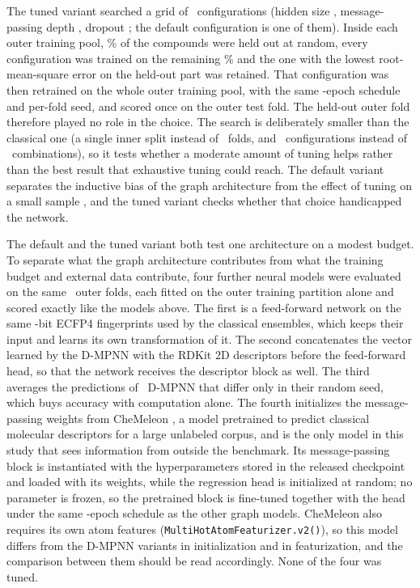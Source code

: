 The tuned variant searched a grid of \GnnTunedNConfigs\ configurations (hidden size \GnnGridHiddenSizes, message-passing depth \GnnGridDepths, dropout \GnnGridDropouts; the default configuration is one of them). Inside each outer training pool, \GnnInnerValPct\% of the compounds were held out at random, every configuration was trained on the remaining \GnnInnerTrainPct\% and the one with the lowest root-mean-square error on the held-out part was retained. That configuration was then retrained on the whole outer training pool, with the same \GnnEpochs-epoch schedule and per-fold seed, and scored once on the outer test fold. The held-out outer fold therefore played no role in the choice. The search is deliberately smaller than the classical one (a single inner split instead of \InnerKFolds\ folds, and \GnnTunedNConfigs\ configurations instead of \NArchitectureCombos\ combinations), so it tests whether a moderate amount of tuning helps rather than the best result that exhaustive tuning could reach. The default variant separates the inductive bias of the graph architecture from the effect of tuning on a small sample \citep{cawley2010, hadas2023}, and the tuned variant checks whether that choice handicapped the network.

The default and the tuned variant both test one architecture on a modest budget. To separate what the graph
architecture contributes from what the training budget and external data contribute, four further neural models were
evaluated on the same \TotalOuterFolds\ outer folds, each fitted on the outer training partition alone and scored
exactly like the models above. The first is a feed-forward network on the same \ExpBNFeaturesTotal-bit ECFP4
fingerprints used by the classical ensembles, which keeps their input and learns its own transformation of it. The
second concatenates the vector learned by the D-MPNN with the RDKit 2D descriptors before the feed-forward head, so
that the network receives the descriptor block as well. The third averages the predictions of \DmpnnEnsembleSeeds\ D-MPNN that differ
only in their random seed, which buys accuracy with computation alone. The fourth initializes the message-passing
weights from CheMeleon \citep{burns2025}, a model pretrained to predict classical molecular descriptors for a large
unlabeled corpus, and is the only model in this study that sees information from outside the benchmark. Its
message-passing block is instantiated with the hyperparameters stored in the released checkpoint and loaded with its
weights, while the regression head is initialized at random; no parameter is frozen, so the pretrained block is
fine-tuned together with the head under the same \GnnEpochs-epoch schedule as the other graph models. CheMeleon also requires
its own atom features (\texttt{MultiHotAtomFeaturizer.v2()}), so this model differs from the D-MPNN variants in
initialization and in featurization, and the comparison between them should be read accordingly. None of the four was
tuned.

